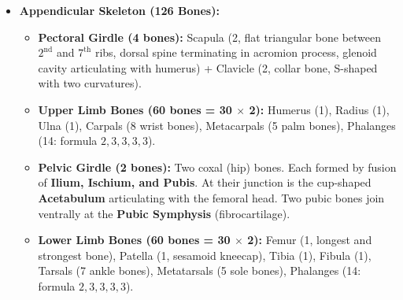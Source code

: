 \documentclass[11pt,a4paper]{article}
\begin{document}
\begin{itemize}[leftmargin=1.5em, itemsep=2pt]
  \item \textbf{Appendicular Skeleton (126 Bones):}
  \begin{itemize}[label=$\circ$]
    \item \textbf{Pectoral Girdle (4 bones):} Scapula (2, flat triangular bone between $2^{\text{nd}}$ and $7^{\text{th}}$ ribs, dorsal spine terminating in acromion process, glenoid cavity articulating with humerus) + Clavicle (2, collar bone, S-shaped with two curvatures).
    \item \textbf{Upper Limb Bones (60 bones = 30 $\times$ 2):} Humerus (1), Radius (1), Ulna (1), Carpals (8 wrist bones), Metacarpals (5 palm bones), Phalanges (14: formula $2, 3, 3, 3, 3$).
    \item \textbf{Pelvic Girdle (2 bones):} Two coxal (hip) bones. Each formed by fusion of \textbf{Ilium, Ischium, and Pubis}. At their junction is the cup-shaped \textbf{Acetabulum} articulating with the femoral head. Two pubic bones join ventrally at the \textbf{Pubic Symphysis} (fibrocartilage).
    \item \textbf{Lower Limb Bones (60 bones = 30 $\times$ 2):} Femur (1, longest and strongest bone), Patella (1, sesamoid kneecap), Tibia (1), Fibula (1), Tarsals (7 ankle bones), Metatarsals (5 sole bones), Phalanges (14: formula $2, 3, 3, 3, 3$).
  \end{itemize}
\end{itemize}
\end{document}
